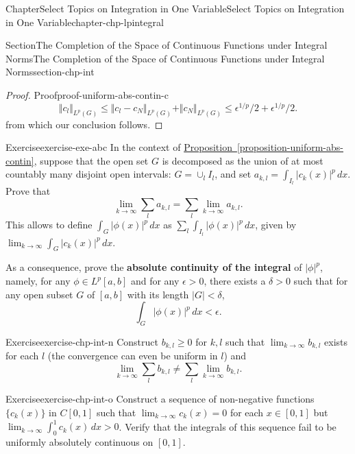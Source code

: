 \documentclass[oneside,10pt,]{book}
\newcommand{\xreffont}{\relax}
\newcommand{\terminology}[1]{\textbf{#1}}
\numberwithin{equation}{section}
\begin{document}
\begin{chapterptx}{Chapter}{Select Topics on Integration in One Variable}{}{Select Topics on Integration in One Variable}{}{}{chapter-chp-lpintegral}
\begin{sectionptx}{Section}{The Completion of the Space of Continuous Functions under Integral Norms}{}{The Completion of the Space of Continuous Functions under Integral Norms}{}{}{section-chp-int}
\begin{proof}{Proof}{}{proof-uniform-abs-contin-c}
\begin{equation*}
\Vert c_{l}\Vert_{L^{p}(G)} \le \Vert c_{l}-c_{N}\Vert_{L^{p}(G)}+ \Vert c_{N}\Vert_{L^{p}(G)}
\le  \epsilon^{1/p}/2 +  \epsilon^{1/p}/2.
\end{equation*}
from which our conclusion follows.\end{proof}
\begin{inlineexercise}{Exercise}{}{exercise-exe-abc}%
In the context of \hyperref[proposition-uniform-abs-contin]{Proposition~{\xreffont\ref{proposition-uniform-abs-contin}}}, suppose that the open set \(G\) is decomposed as the union of at most countably many disjoint open intervals: \(G=\cup_{l}I_{l}\), and set \(a_{k, l}=\int_{I_{l}} |c_{k}(x)|^{p}\, dx\). Prove that%
\begin{equation*}
\lim_{k\to\infty} \sum_{l} a_{k, l}= \sum_{l} \lim_{k\to\infty}  a_{k, l}.
\end{equation*}
This allows to define \(\int_{G} |\phi(x)|^{p}\, dx \) as \(\sum_{l} \int_{I_{l}} |\phi(x)|^{p}\, dx\), given by \(\lim_{k\to\infty} \int_{G} |c_{k}(x)|^{p}\, dx\).%
\par
As a consequence, prove the \terminology{absolute continuity of the integral} of \(|\phi|^{p}\), namely, for any \(\phi \in L^{p}[a, b]\) and for any \(\epsilon > 0\), there exists a \(\delta > 0\) such that for any open subset \(G\) of \([a, b]\) with its length \(|G| < \delta\),%
\begin{equation*}
\int_{G} |\phi(x)|^{p}\, dx < \epsilon.
\end{equation*}
%
\end{inlineexercise}%
\begin{inlineexercise}{Exercise}{}{exercise-chp-int-n}%
Construct \(b_{k, l}\ge 0\) for \(k, l\) such that \(\lim_{k\to\infty}  b_{k, l}\) exists for each \(l\) (the convergence can even be uniform in \(l\)) and%
\begin{equation*}
\lim_{k\to\infty} \sum_{l} b_{k, l}\ne \sum_{l} \lim_{k\to\infty}  b_{k, l}.
\end{equation*}
%
\end{inlineexercise}%
\begin{inlineexercise}{Exercise}{}{exercise-chp-int-o}%
Construct a sequence of non-negative functions \(\{c_{k}(x)\}\) in \(C[0, 1]\) such that \(\lim_{k\to\infty} c_{k}(x)=0\) for each \(x\in [0, 1]\) but \(\lim_{k\to\infty} \int_{0}^{1}c_{k}(x)\, dx > 0\). Verify that the integrals of this sequence fail to be uniformly absolutely continuous on \([0, 1]\).%
\end{inlineexercise}%

\end{sectionptx}
\end{chapterptx}
\end{document}
